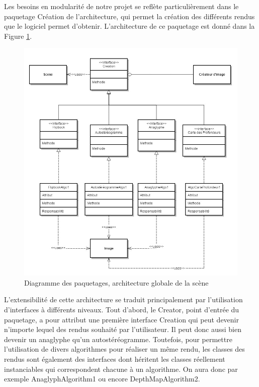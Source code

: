         Les besoins en modularité de notre projet se reflète particulièrement dans le paquetage Création de l'architecture, qui permet la création des différents rendus que le logiciel permet d'obtenir. L'architecture de ce paquetage est donné dans la Figure \ref{fig:creation}.

\begin{figure}[h]
	\centering      
	\includegraphics[scale=0.45]{package_creation.jpg}
	\caption{\label{fig:creation} Diagramme des paquetages, architecture globale de la scène \protect \footnotemark}
\end{figure}

        L'extensibilité de cette architecture se traduit principalement par l'utilisation d'interfaces à différents niveaux. Tout d'abord, le Creator, point d'entrée du paquetage, a pour attribut une première interface Creation qui peut devenir n'importe lequel des rendus souhaité par l'utilisateur. Il peut donc aussi bien devenir un anaglyphe qu'un autostéréogramme. Toutefois, pour permettre l'utilisation de divers algorithmes pour réaliser un même rendu, les classes des rendus sont également des interfaces dont héritent les classes réellement instanciables qui correspondent chacune à un algorithme. On aura donc par exemple AnaglyphAlgorithm1 ou encore DepthMapAlgorithm2.
